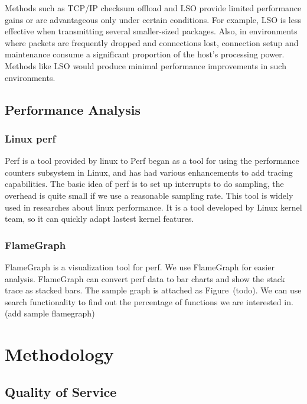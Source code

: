 \documentclass[bsc,frontabs,twoside,singlespacing,parskip,deptreport]{infthesis}     %
\begin{document}
Methods such as TCP/IP checksum offload and LSO provide limited performance gains or are advantageous only under certain conditions. For example, LSO is less effective when transmitting several smaller-sized packages. Also, in environments where packets are frequently dropped and connections lost, connection setup and maintenance consume a significant proportion of the host’s processing power. Methods like LSO would produce minimal performance improvements in such environments.



\section{Performance Analysis}

\subsection{Linux perf}

Perf is a tool provided by linux to 
Perf began as a tool for using the performance counters subsystem in Linux, and has had various enhancements to add tracing capabilities. The basic idea of perf is to set up interrupts to do sampling, the overhead is quite small if we use a reasonable sampling rate. This tool is widely used in researches about linux performance. It is a tool developed by Linux kernel team, so it can quickly adapt lastest kernel features.

\subsection{FlameGraph}
FlameGraph \cite{flamegraph} is a visualization tool for perf. We use FlameGraph for easier analysis. FlameGraph can convert perf data to bar charts and show the stack trace as stacked bars. The sample graph is attached as Figure~(todo). We can use search functionality to find out the percentage of functions we are interested in. (add sample flamegraph)







\chapter{Methodology}



\section{Quality of Service}
\end{document}
